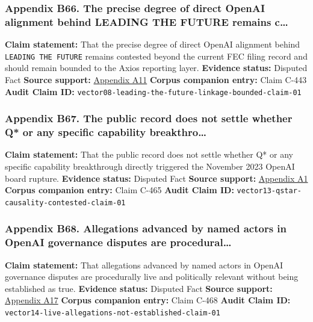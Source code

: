 \documentclass[
  american,
  11pt,
  letterpaper,
]{article}
\begin{document}
\subsubsection{Appendix B66. The precise degree of direct OpenAI
alignment behind LEADING THE FUTURE remains
c\ldots{}}\label{ch-08-appendix-b66-the-precise-degree-of-direct-openai-alignment-behind-leading-the-future-remains-c}

\textbf{Claim statement:} That the precise degree of direct OpenAI
alignment behind \texttt{LEADING\ THE\ FUTURE} remains contested beyond
the current FEC filing record and should remain bounded to the Axios
reporting layer. \textbf{Evidence status:} Disputed Fact \textbf{Source
support:}
\hyperref[ch-08-appendix-a11-leading-the-future-committee-overview]{Appendix
A11} \textbf{Corpus companion entry:} Claim C-443 \textbf{Audit Claim
ID:} \texttt{vector08-leading-the-future-linkage-bounded-claim-01}

\subsubsection{Appendix B67. The public record does not settle whether
Q* or any specific capability
breakthro\ldots{}}\label{ch-08-appendix-b67-the-public-record-does-not-settle-whether-q-or-any-specific-capability-breakthro}

\textbf{Claim statement:} That the public record does not settle whether
Q* or any specific capability breakthrough directly triggered the
November 2023 OpenAI board rupture. \textbf{Evidence status:} Disputed
Fact \textbf{Source support:}
\hyperref[ch-08-appendix-a1-openai-announces-leadership-transition]{Appendix
A1} \textbf{Corpus companion entry:} Claim C-465 \textbf{Audit Claim
ID:} \texttt{vector13-qstar-causality-contested-claim-01}

\subsubsection{Appendix B68. Allegations advanced by named actors in
OpenAI governance disputes are
procedural\ldots{}}\label{ch-08-appendix-b68-allegations-advanced-by-named-actors-in-openai-governance-disputes-are-procedural}

\textbf{Claim statement:} That allegations advanced by named actors in
OpenAI governance disputes are procedurally live and politically
relevant without being established as true. \textbf{Evidence status:}
Disputed Fact \textbf{Source support:}
\hyperref[ch-08-appendix-a17-musk-v-altman-4-24-cv-04722]{Appendix A17}
\textbf{Corpus companion entry:} Claim C-468 \textbf{Audit Claim ID:}
\texttt{vector14-live-allegations-not-established-claim-01}
\end{document}
